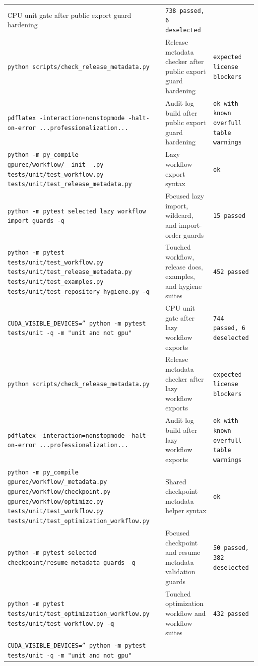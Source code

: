 \documentclass[11pt]{article}
\begin{document}
\begin{center}
\begin{tabular}{lll}
CPU unit gate after public export guard hardening &
\texttt{738 passed, 6 deselected} \\
\texttt{python scripts/check\_release\_metadata.py} &
Release metadata checker after public export guard hardening &
\texttt{expected license blockers} \\
\texttt{pdflatex -interaction=nonstopmode -halt-on-error ...professionalization...} &
Audit log build after public export guard hardening &
\texttt{ok with known overfull table warnings} \\
\texttt{python -m py\_compile gpurec/workflow/\_\_init\_\_.py tests/unit/test\_workflow.py tests/unit/test\_release\_metadata.py} &
Lazy workflow export syntax &
\texttt{ok} \\
\texttt{python -m pytest selected lazy workflow import guards -q} &
Focused lazy import, wildcard, and import-order guards &
\texttt{15 passed} \\
\texttt{python -m pytest tests/unit/test\_workflow.py tests/unit/test\_release\_metadata.py tests/unit/test\_examples.py tests/unit/test\_repository\_hygiene.py -q} &
Touched workflow, release docs, examples, and hygiene suites &
\texttt{452 passed} \\
\texttt{CUDA\_VISIBLE\_DEVICES='' python -m pytest tests/unit -q -m "unit and not gpu"} &
CPU unit gate after lazy workflow exports &
\texttt{744 passed, 6 deselected} \\
\texttt{python scripts/check\_release\_metadata.py} &
Release metadata checker after lazy workflow exports &
\texttt{expected license blockers} \\
\texttt{pdflatex -interaction=nonstopmode -halt-on-error ...professionalization...} &
Audit log build after lazy workflow exports &
\texttt{ok with known overfull table warnings} \\
\texttt{python -m py\_compile gpurec/workflow/\_metadata.py gpurec/workflow/checkpoint.py gpurec/workflow/optimize.py tests/unit/test\_workflow.py tests/unit/test\_optimization\_workflow.py} &
Shared checkpoint metadata helper syntax &
\texttt{ok} \\
\texttt{python -m pytest selected checkpoint/resume metadata guards -q} &
Focused checkpoint and resume metadata validation guards &
\texttt{50 passed, 382 deselected} \\
\texttt{python -m pytest tests/unit/test\_optimization\_workflow.py tests/unit/test\_workflow.py -q} &
Touched optimization workflow and workflow suites &
\texttt{432 passed} \\
\texttt{CUDA\_VISIBLE\_DEVICES='' python -m pytest tests/unit -q -m "unit and not gpu"} &

\end{tabular}
\end{center}
\end{document}
